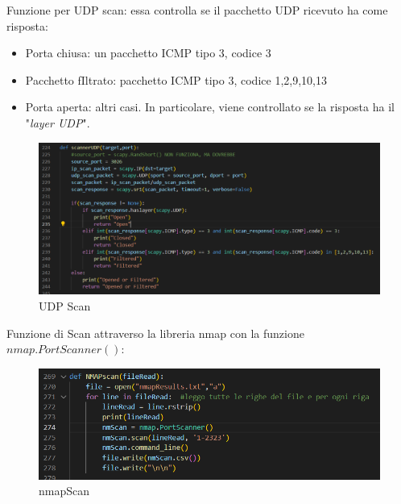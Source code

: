 Funzione per UDP scan: essa controlla se il pacchetto UDP ricevuto ha come risposta:
\begin{itemize}
    \item Porta chiusa: un pacchetto ICMP tipo 3, codice 3
    \item Pacchetto fIltrato: pacchetto ICMP tipo 3, codice 1,2,9,10,13
    \item Porta aperta: altri casi. In particolare, viene controllato se la risposta ha il "\textit{layer UDP}".
\end{itemize}

\begin{figure}[H]
    \centering
    \includegraphics[scale=0.4]{UNINA_MSc_Thesis_Project/img/Codice/UDPScanner.png}
    \caption{UDP Scan}
    \label{fig:my_label}
\end{figure}

Funzione di Scan attraverso la libreria nmap con la funzione $nmap.PortScanner()$:

\begin{figure}[H]
    \centering
    \includegraphics[scale=0.5]{UNINA_MSc_Thesis_Project/img/Codice/nmapScan.png}
    \caption{nmapScan}
    \label{fig:my_label}
\end{figure}





